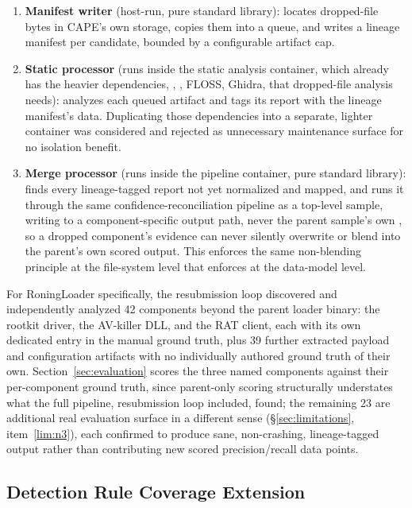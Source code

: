 \begin{enumerate}
  \item \textbf{Manifest writer} (host-run, pure standard library):
    locates dropped-file bytes in CAPE's own storage, copies them into
    a queue, and writes a lineage manifest per candidate, bounded by a
    configurable artifact cap.
  \item \textbf{Static processor} (runs inside the static analysis
    container, which already has the heavier dependencies, ,
    , FLOSS, Ghidra, that dropped-file analysis
    needs): analyzes each queued artifact and tags its report with the
    lineage manifest's data. Duplicating those dependencies into a
    separate, lighter container was considered and rejected as
    unnecessary maintenance surface for no isolation benefit.
  \item \textbf{Merge processor} (runs inside the pipeline container,
    pure standard library): finds every lineage-tagged report not yet
    normalized and mapped, and runs it through the same
    confidence-reconciliation pipeline as a top-level sample, writing
    to a component-specific output path, never the parent sample's own
    , so a dropped component's evidence can
    never silently overwrite or blend into the parent's own scored
    output. This enforces the same non-blending principle at the
    file-system level that  enforces at the
    data-model level.
\end{enumerate}

For RoningLoader specifically, the resubmission loop discovered and
independently analyzed 42 components beyond the parent loader binary:
the rootkit driver, the AV-killer DLL, and the RAT client, each with
its own dedicated entry in the manual ground truth, plus 39 further
extracted payload and configuration artifacts with no individually
authored ground truth of their own. Section~\ref{sec:evaluation} scores
the three named components against their per-component ground truth,
since parent-only scoring structurally understates what the full
pipeline, resubmission loop included, found; the remaining 23 are
additional real evaluation surface in a different sense
(\S\ref{sec:limitations}, item~\ref{lim:n3}), each confirmed to produce sane,
non-crashing, lineage-tagged output rather than contributing new scored
precision/recall data points.

\subsection{Detection Rule Coverage Extension}
\label{sec:coverage}

